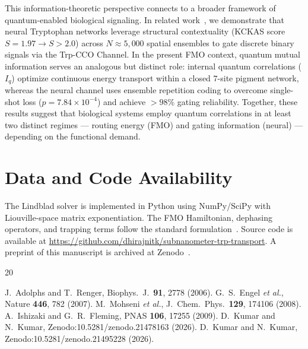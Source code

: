 \documentclass[aps,jcp,twocolumn,showpacs,superscriptaddress]{revtex4-2}
\begin{document}
This information-theoretic perspective connects to a broader framework of quantum-enabled biological signaling. In related work~\cite{TrpCCO2026}, we demonstrate that neural Tryptophan networks leverage structural contextuality (KCKAS score $S = 1.97 \to S > 2.0$) across $N \approx 5,000$ spatial ensembles to gate discrete binary signals via the Trp-CCO Channel. In the present FMO context, quantum mutual information serves an analogous but distinct role: internal quantum correlations ($I_q$) optimize continuous energy transport within a closed $7$-site pigment network, whereas the neural channel uses ensemble repetition coding to overcome single-shot loss ($p = 7.84\times10^{-4}$) and achieve $>98\%$ gating reliability. Together, these results suggest that biological systems employ quantum correlations in at least two distinct regimes --- routing energy (FMO) and gating information (neural) --- depending on the functional demand.

\section{Data and Code Availability}

The Lindblad solver is implemented in Python using NumPy/SciPy with Liouville-space matrix exponentiation. The FMO Hamiltonian, dephasing operators, and trapping terms follow the standard formulation~\cite{Adolphs2006, Mohseni2008}. Source code is available at \url{https://github.com/dhirajnitk/subnanometer-trp-transport}. A preprint of this manuscript is archived at Zenodo~\cite{FMOZenodo2026}.

\FloatBarrier
\begin{thebibliography}{20}

 J.\ Adolphs and T.\ Renger, Biophys.\ J.\ \textbf{91}, 2778 (2006).
 G.\ S.\ Engel \textit{et al.}, Nature \textbf{446}, 782 (2007).
 M.\ Mohseni \textit{et al.}, J.\ Chem.\ Phys.\ \textbf{129}, 174106 (2008).
 A.\ Ishizaki and G.\ R.\ Fleming, PNAS \textbf{106}, 17255 (2009).
 D.\ Kumar and N.\ Kumar, Zenodo:10.5281/zenodo.21478163 (2026).
 D.\ Kumar and N.\ Kumar, Zenodo:10.5281/zenodo.21495228 (2026).

\end{thebibliography}
\end{document}
